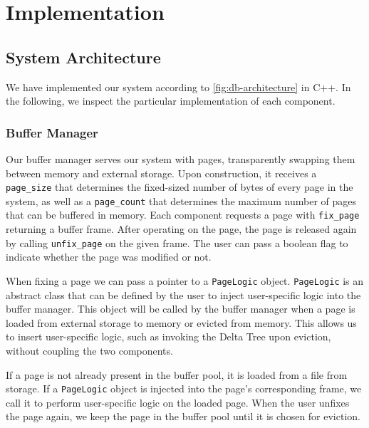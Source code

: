 \chapter{Implementation}
\label{chap:implementation}



\section{System Architecture}

We have implemented our system according to \autoref{fig:db-architecture} in C++. 
In the following, we inspect the particular implementation of each component.

\subsection*{Buffer Manager}
Our buffer manager serves our system with pages, transparently swapping them between memory and external storage.
Upon construction, it receives a \texttt{page\_size} that determines the fixed-sized number of bytes of every page in the system, as well as a \texttt{page\_count} that determines the maximum number of pages that can be buffered in memory.
Each component requests a page with \texttt{fix\_page} returning a buffer frame. 
After operating on the page, the page is released again by calling \texttt{unfix\_page} on the given frame.
The user can pass a boolean flag to indicate whether the page was modified or not.

When fixing a page we can pass a pointer to a \texttt{PageLogic} object.
\texttt{PageLogic} is an abstract class that can be defined by the user to inject user-specific logic into the buffer manager.
This object will be called by the buffer manager when a page is loaded from external storage to memory or evicted from memory.
This allows us to insert user-specific logic, such as invoking the Delta Tree upon eviction, without coupling the two components.

If a page is not already present in the buffer pool, it is loaded from a file from storage. 
If a \texttt{PageLogic} object is injected into the page's corresponding frame, we call it to perform user-specific logic on the loaded page.
When the user unfixes the page again, we keep the page in the buffer pool until it is chosen for eviction.

